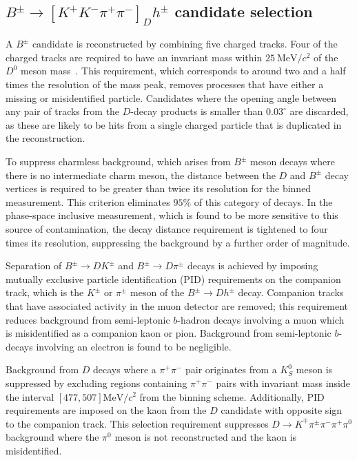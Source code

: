 \documentclass[12pt, a4paper, notitlepage, onecolumn]{article}
\begin{document}
\subsection{\texorpdfstring{$B^\pm\to[K^+K^-\pi^+\pi^-]_Dh^\pm$}{B2DhD2KKpipi} candidate selection}
\noindent A $B^\pm$ candidate is reconstructed by combining five charged tracks. Four of the charged tracks are required to have an invariant mass within $\SI{25}{\mega\eV/c^2}$ of the $D^0$ meson mass~\cite{PDG2022}. This requirement, which corresponds to around two and a half times the resolution of the mass peak, removes processes that have either a missing or misidentified particle. Candidates where the opening angle between any pair of tracks from the $D$-decay products is smaller than $0.03^\circ$ are discarded, as these are likely to be hits from a single charged particle that is duplicated in the reconstruction.

To suppress charmless background, which arises from $B^\pm$ meson decays where there is no intermediate charm meson, the distance between the $D$ and $B^\pm$ decay vertices is required to be greater than twice its resolution for the binned measurement. This criterion eliminates $95\%$ of this category of decays. In the phase-space inclusive measurement, which is found to be more sensitive to this source of contamination, the decay distance requirement is tightened to four times its resolution, suppressing the background by a further order of magnitude.

Separation of $B^\pm\to DK^\pm$ and $B^\pm\to D\pi^\pm$ decays is achieved by imposing mutually exclusive particle identification (PID) requirements on the companion track, which is the $K^\pm$ or $\pi^\pm$ meson of the $B^\pm\to Dh^\pm$ decay. Companion tracks that have associated activity in the muon detector are removed; this requirement reduces background from semi-leptonic $b$-hadron decays involving a muon which is misidentified as a companion kaon or pion. Background from semi-leptonic $b$-decays involving an electron is found to be negligible.  

Background from $D$ decays where a $\pi^+\pi^-$ pair originates from a $K^0_S$ meson is suppressed by excluding regions containing $\pi^+\pi^-$ pairs with invariant mass inside the interval $[477, 507]\si{\mega\eV/c^2}$ from the binning scheme. Additionally, PID requirements are imposed on the kaon from the $D$ candidate with opposite sign to the companion track. This selection requirement suppresses $D\to K^\mp\pi^\pm\pi^-\pi^+\pi^0$ background where the $\pi^0$ meson is not reconstructed and the kaon is misidentified. 
\end{document}
